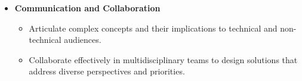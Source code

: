 \begin{itemize}
    \item \textbf{Communication and Collaboration}
    \begin{itemize}
        \item Articulate complex \ai{} concepts and their implications to technical and non-technical audiences.
        \item Collaborate effectively in multidisciplinary teams to design \ai{} solutions that address diverse perspectives and priorities.
    \end{itemize}
\end{itemize} 